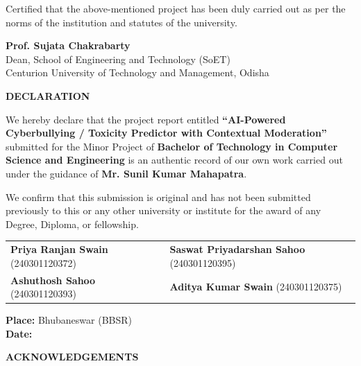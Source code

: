 \documentclass[12pt,a4paper]{article}
\begin{document}
\vspace{1.8cm}
\noindent Certified that the above-mentioned project has been duly carried out as per the norms of the institution and statutes of the university.

\vspace{2.2cm}
\noindent
\textbf{Prof. Sujata Chakrabarty}\\
Dean, School of Engineering and Technology (SoET)\\
Centurion University of Technology and Management, Odisha

\newpage
\thispagestyle{plain}
\begin{center}
    {\Large \textbf{DECLARATION}\par}
    \vspace{0.8cm}
\end{center}

\noindent We hereby declare that the project report entitled \textbf{``AI-Powered Cyberbullying / Toxicity Predictor with Contextual Moderation''} submitted for the Minor Project of \textbf{Bachelor of Technology in Computer Science and Engineering} is an authentic record of our own work carried out under the guidance of \textbf{Mr. Sunil Kumar Mahapatra}.

\noindent We confirm that this submission is original and has not been submitted previously to this or any other university or institute for the award of any Degree, Diploma, or fellowship.

\vspace{3.5cm}

\noindent
\begin{tabular}{p{7cm}p{7cm}}
    \textbf{Priya Ranjan Swain} (240301120372) & \textbf{Saswat Priyadarshan Sahoo} (240301120395) \\[1.2cm]
    \textbf{Ashuthosh Sahoo} (240301120393) & \textbf{Aditya Kumar Swain} (240301120375)
\end{tabular}

\vspace{1.5cm}
\noindent \textbf{Place:} Bhubaneswar (BBSR)\\
\textbf{Date:} 

\newpage
\thispagestyle{plain}
\begin{center}
    {\Large \textbf{ACKNOWLEDGEMENTS}\par}
    \vspace{0.8cm}
\end{center}
\end{document}
